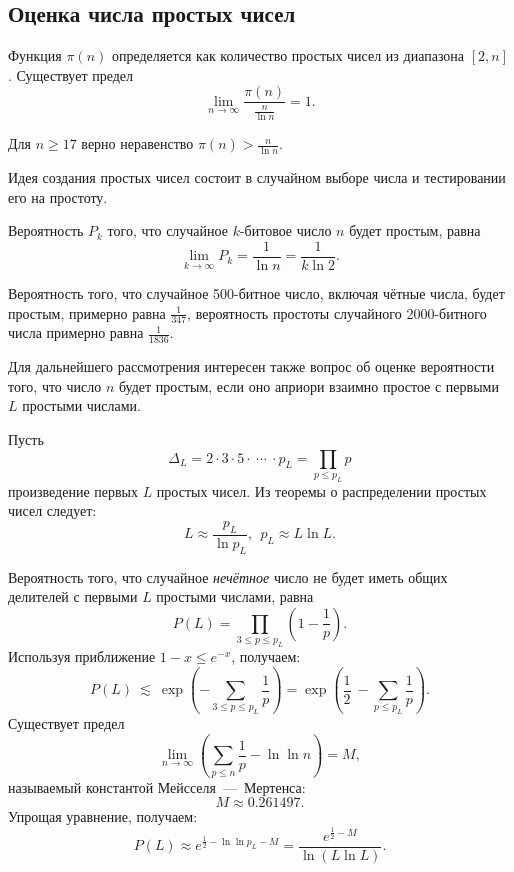 \subsection{Оценка числа простых чисел}

Функция $\pi(n)$ определяется как количество простых чисел из диапазона $[2, n]$.
Существует предел~\cite{Selberg:1949}
    \[ \lim\limits_{n \rightarrow \infty}\frac{ \pi(n)}{ \frac{n}{\ln n}}=1. \]

Для $n \geq 17$ верно неравенство $\pi(n) > \frac{n}{\ln n}$.

Идея создания простых чисел состоит в случайном выборе числа и тестировании его на простоту.

Вероятность $P_k$ того, что случайное $k$-битовое число $n$ будет простым, равна
    \[ \lim\limits_{k \rightarrow \infty} P_k = \frac{1}{\ln n} = \frac{1}{k \ln 2}. \]

\example
    Вероятность того, что случайное 500-битное число, включая чётные числа, будет простым, примерно равна $\frac{1}{347}$, вероятность простоты случайного 2000-битного числа примерно равна $\frac{1}{1836}$.
\exampleend

Для дальнейшего рассмотрения интересен также вопрос об оценке вероятности того, что число $n$ будет простым, если оно априори взаимно простое с первыми $L$ простыми числами.

Пусть
    \[ \Delta_L = 2 \cdot 3 \cdot 5 \cdot ~\cdots~ \cdot p_L = \prod \limits_{p \leq p_L} p \] 
произведение первых $L$ простых чисел. Из теоремы о распределении простых чисел следует:
    \[ L \approx \frac{p_L}{\ln p_L}, ~~ p_L \approx L \ln L. \]

Вероятность того, что случайное \emph{нечётное} число не будет иметь общих делителей с первыми $L$ простыми числами, равна
    \[ P(L) = \prod \limits_{3 \leq p \leq p_L} \left( 1 - \frac{1}{p} \right). \]
Используя приближение $1-x \leq e^{-x}$, получаем:
   \[ P(L) ~\lesssim~ \operatorname{exp}( {-\sum\limits_{3 \leq p \leq p_L} \frac{1}{p}}) = \operatorname{exp}( {\frac{1}{2} ~ - \sum\limits_{p \leq p_L} \frac{1}{p}}). \]
Существует предел
    \[ \lim \limits_{n \rightarrow \infty} \left( \sum \limits_{p \leq n} \frac{1}{p} - \ln \ln n \right) = M, \]
называемый константой Мейсселя~---~Мертенса:
    \[ M \approx 0.261497. \]
Упрощая уравнение, получаем:
    \[ P(L) \approx e^{\frac{1}{2} - \ln \ln p_L - M} = \frac{e^{\frac{1}{2} - M}}{\ln(L \ln L)}. \]

